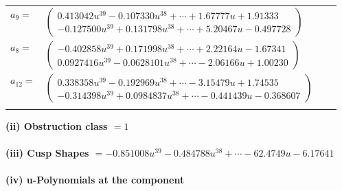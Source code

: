 \documentclass[1p]{elsarticle_modified}
\theoremstyle{definition}
\begin{document}
\begin{tabular}{m{7pt} m{180pt} m{7pt} m{180pt} }
\flushright $a_{9}=$&$\begin{pmatrix}0.413042 u^{39}-0.107330 u^{38}+\cdots+1.67777 u+1.91333\\-0.127500 u^{39}+0.131798 u^{38}+\cdots+5.20467 u-0.497728\end{pmatrix}$ \\
\flushright $a_{8}=$&$\begin{pmatrix}-0.402858 u^{39}+0.171998 u^{38}+\cdots+2.22164 u-1.67341\\0.0927416 u^{39}-0.0628101 u^{38}+\cdots-2.06166 u+1.00230\end{pmatrix}$ \\
\flushright $a_{12}=$&$\begin{pmatrix}0.338358 u^{39}-0.192969 u^{38}+\cdots-3.15479 u+1.74535\\-0.314398 u^{39}+0.0984837 u^{38}+\cdots-0.441439 u-0.368607\end{pmatrix}$\\&\end{tabular}
\flushleft \textbf{(ii) Obstruction class $= 1$}\\~\\
\flushleft \textbf{(iii) Cusp Shapes $= -0.851008 u^{39}-0.484788 u^{38}+\cdots-62.4749 u-6.17641$}\\~\\
\newpage\renewcommand{\arraystretch}{1}
\flushleft \textbf{(iv) u-Polynomials at the component}\newline \\
\end{document}
